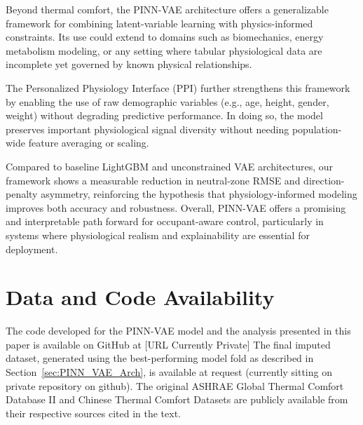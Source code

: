 Beyond thermal comfort, the PINN-VAE architecture offers a generalizable framework for combining latent-variable learning with physics-informed constraints. Its use could extend to domains such as biomechanics, energy metabolism modeling, or any setting where tabular physiological data are incomplete yet governed by known physical relationships.

The Personalized Physiology Interface (PPI) further strengthens this framework by enabling the use of raw demographic variables (e.g., age, height, gender, weight) without degrading predictive performance. In doing so, the model preserves important physiological signal diversity without needing population-wide feature averaging or scaling.

Compared to baseline LightGBM and unconstrained VAE architectures, our framework shows a measurable reduction in neutral-zone RMSE and direction-penalty asymmetry, reinforcing the hypothesis that physiology-informed modeling improves both accuracy and robustness. Overall, PINN-VAE offers a promising and interpretable path forward for occupant-aware control, particularly in systems where physiological realism and explainability are essential for deployment.



\section*{Data and Code Availability}
The code developed for the PINN-VAE model and the analysis presented in this paper is available on GitHub at [URL Currently Private] The final imputed dataset, generated using the best-performing model fold as described in Section~\ref{sec:PINN_VAE_Arch}, is available at request (currently sitting on private repository on github). The original ASHRAE Global Thermal Comfort Database II and Chinese Thermal Comfort Datasets are publicly available from their respective sources cited in the text.